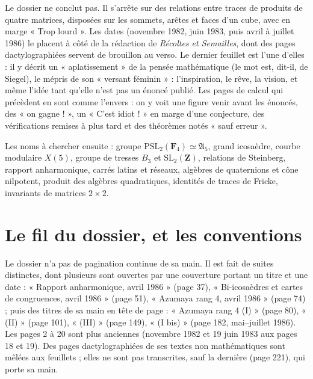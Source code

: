 \documentclass[11pt,a4paper]{article}
\begin{document}
\begin{resume}
Le dossier ne conclut pas. Il s'arrête sur des relations entre traces de
produits de quatre matrices, disposées sur les sommets, arêtes et faces d'un
cube, avec en marge « Trop lourd ». Les dates (novembre 1982, juin 1983, puis
avril à juillet 1986) le placent à côté de la rédaction de \emph{Récoltes et
Semailles}, dont des pages dactylographiées servent de brouillon au verso. Le
dernier feuillet est l'une d'elles : il y décrit un « aplatissement » de la
pensée mathématique (le mot est, dit-il, de Siegel), le mépris de son
« versant féminin » : l'inspiration, le rêve, la vision, et même l'idée tant
qu'elle n'est pas un énoncé publié. Les pages de calcul qui précèdent en sont
comme l'envers : on y voit une figure venir avant les énoncés, des « on
gagne ! », un « C'est idiot ! » en marge d'une conjecture, des vérifications
remises à plus tard et des théorèmes notés « sauf erreur ».

Les noms à chercher ensuite : groupe $\mathrm{PSL}_2(\mathbf{F}_4) \simeq
\mathfrak{A}_5$, grand icosaèdre, courbe modulaire $X(5)$, groupe de tresses
$B_3$ et $\mathrm{SL}_2(\mathbf{Z})$, relations de Steinberg, rapport
anharmonique, carrés latins et réseaux, algèbres de quaternions et cône
nilpotent, produit des algèbres quadratiques, identités de traces de Fricke,
invariants de matrices $2 \times 2$.

\end{resume}

\section*{Le fil du dossier, et les conventions}

Le dossier n'a pas de pagination continue de sa main. Il est fait de suites
distinctes, dont plusieurs sont ouvertes par une couverture portant un titre
et une date : « Rapport anharmonique, avril 1986 » (page 37), « Bi-icosaèdres
et cartes de congruences, avril 1986 » (page 51), « Azumaya rang 4, avril
1986 » (page 74) ; puis des titres de sa main en tête de page : « Azumaya
rang 4 (I) » (page 80), « (II) » (page 101), « (III) » (page 149), « (I bis) »
(page 182, mai--juillet 1986). Les pages 2 à 20 sont plus anciennes
(novembre 1982 et 19 juin 1983 aux pages 18 et 19). Des pages dactylographiées
de ses textes non mathématiques sont mêlées aux feuillets ; elles ne sont pas
transcrites, sauf la dernière (page 221), qui porte sa main.
\end{document}
